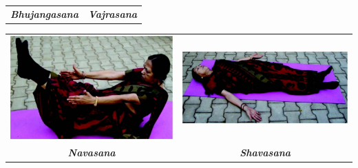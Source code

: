\begin{center}
\begin{tabular}{@{}cc@{}}
{\textbf{\textit{Bhujangasana}}} &
{\textbf{\textit{Vajrasana}}}\\
\end{tabular}
\end{center}


\begin{center}
\begin{tabular}{@{}cc@{}}
\includegraphics[scale=.9]{images/094.jpg} &
\includegraphics[scale=1.3]{images/095.jpg}\\
{\textbf{\textit{Navasana}}} &
{\textbf{\textit{Shavasana}}}\\
\end{tabular}
\end{center}



